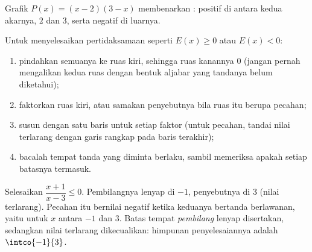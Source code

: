 \begin{omfigure}

{\small Grafik $P(x) = (x-2)(3-x)$ membenarkan : positif di
antara kedua akarnya, $2$ dan $3$, serta negatif di luarnya.}
\end{omfigure}

\begin{method}\label{met:g10:algebra:signtable}
Untuk menyelesaikan pertidaksamaan seperti $E(x) \geq 0$ atau $E(x) < 0$:
\begin{enumerate}
  \item pindahkan semuanya ke ruas kiri, sehingga ruas kanannya
        $0$ (jangan pernah mengalikan kedua ruas dengan bentuk aljabar yang
        tandanya belum diketahui);
  \item faktorkan ruas kiri, atau samakan penyebutnya bila ruas itu berupa
        pecahan;
  \item susun  dengan satu baris untuk setiap faktor (untuk
        pecahan, tandai nilai terlarang dengan garis rangkap pada baris terakhir);
  \item bacalah  tempat tanda yang diminta berlaku, sambil memeriksa
        apakah setiap batasnya termasuk.
\end{enumerate}
\end{method}

\begin{example}\label{ex:g10:algebra:quotientineq}
Selesaikan $\dfrac{x + 1}{x - 3} \leq 0$. Pembilangnya lenyap di $-1$,
penyebutnya di $3$ (nilai terlarang). Pecahan itu bernilai negatif ketika
keduanya bertanda berlawanan, yaitu untuk $x$ antara $-1$ dan $3$. Batas
tempat \emph{pembilang} lenyap disertakan, sedangkan nilai terlarang
dikecualikan: himpunan penyelesaiannya adalah $\intco{-1}{3}$.
\end{example}

